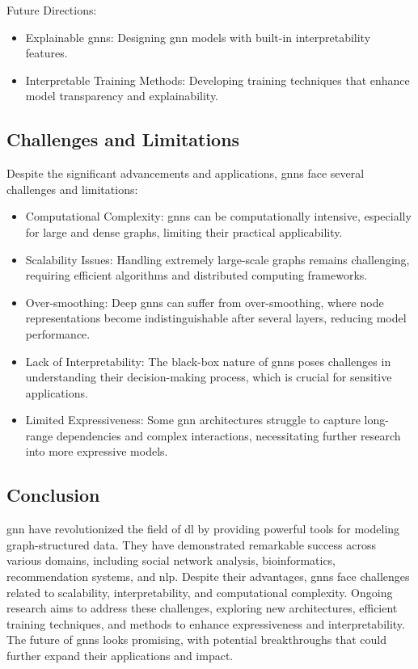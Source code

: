 Future Directions:
\begin{itemize}
    \item Explainable \glspl{gnn}: Designing \gls{gnn} models with built-in interpretability features.
    \item Interpretable Training Methods: Developing training techniques that enhance model transparency and explainability.
\end{itemize}

\subsection*{Challenges and Limitations}

Despite the significant advancements and applications, \glspl{gnn} face several challenges and limitations:
\begin{itemize}
    \item Computational Complexity: \glspl{gnn} can be computationally intensive, especially for large and dense graphs, limiting their practical applicability.
    \item Scalability Issues: Handling extremely large-scale graphs remains challenging, requiring efficient algorithms and distributed computing frameworks.
    \item Over-smoothing: Deep \glspl{gnn} can suffer from over-smoothing, where node representations become indistinguishable after several layers, reducing model performance.
    \item Lack of Interpretability: The black-box nature of \glspl{gnn} poses challenges in understanding their decision-making process, which is crucial for sensitive applications.
    \item Limited Expressiveness: Some \gls{gnn} architectures struggle to capture long-range dependencies and complex interactions, necessitating further research into more expressive models.
\end{itemize}

\subsection*{Conclusion}

\acrlong{gnn} have revolutionized the field of \acrlong{dl} by providing powerful tools for modeling graph-structured data. They have demonstrated remarkable success across various domains, including social network analysis, bioinformatics, recommendation systems, and \gls{nlp}. Despite their advantages, \glspl{gnn} face challenges related to scalability, interpretability, and computational complexity. Ongoing research aims to address these challenges, exploring new architectures, efficient training techniques, and methods to enhance expressiveness and interpretability. The future of \glspl{gnn} looks promising, with potential breakthroughs that could further expand their applications and impact.
